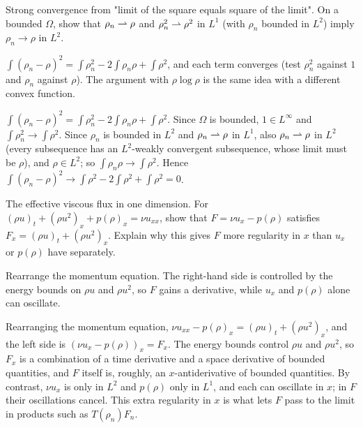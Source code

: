 \begin{exercise}
  Strong convergence from "limit of the square equals square of the limit". On a bounded $\Omega$, show that $\rho_n \rightharpoonup \rho$ and $\rho_n^2 \rightharpoonup \rho^2$ in $L^1$ (with $\rho_n$ bounded in $L^2$) imply $\rho_n \to \rho$ in $L^2$.
  \begin{hint}
    $\int(\rho_n - \rho)^2 = \int\rho_n^2 - 2\int\rho_n\rho + \int\rho^2$, and each term converges (test $\rho_n^2$ against $1$ and $\rho_n$ against $\rho$). The argument with $\rho\log\rho$ is the same idea with a different convex function.
  \end{hint}
  \begin{solution}
    $\int(\rho_n - \rho)^2 = \int\rho_n^2 - 2\int\rho_n\rho + \int\rho^2$. Since $\Omega$ is bounded, $1 \in L^\infty$ and $\int\rho_n^2 \to \int\rho^2$. Since $\rho_n$ is bounded in $L^2$ and $\rho_n \rightharpoonup \rho$ in $L^1$, also $\rho_n \rightharpoonup \rho$ in $L^2$ (every subsequence has an $L^2$-weakly convergent subsequence, whose limit must be $\rho$), and $\rho \in L^2$; so $\int\rho_n\rho \to \int\rho^2$. Hence $\int(\rho_n - \rho)^2 \to \int\rho^2 - 2\int\rho^2 + \int\rho^2 = 0$.
  \end{solution}
\end{exercise}

\begin{exercise}
  The effective viscous flux in one dimension. For $(\rho u)_t + (\rho u^2)_x + p(\rho)_x = \nu u_{xx}$, show that $F = \nu u_x - p(\rho)$ satisfies $F_x = (\rho u)_t + (\rho u^2)_x$. Explain why this gives $F$ more regularity in $x$ than $u_x$ or $p(\rho)$ have separately.
  \begin{hint}
    Rearrange the momentum equation. The right-hand side is controlled by the energy bounds on $\rho u$ and $\rho u^2$, so $F$ gains a derivative, while $u_x$ and $p(\rho)$ alone can oscillate.
  \end{hint}
  \begin{solution}
    Rearranging the momentum equation, $\nu u_{xx} - p(\rho)_x = (\rho u)_t + (\rho u^2)_x$, and the left side is $(\nu u_x - p(\rho))_x = F_x$. The energy bounds control $\rho u$ and $\rho u^2$, so $F_x$ is a combination of a time derivative and a space derivative of bounded quantities, and $F$ itself is, roughly, an $x$-antiderivative of bounded quantities. By contrast, $\nu u_x$ is only in $L^2$ and $p(\rho)$ only in $L^1$, and each can oscillate in $x$; in $F$ their oscillations cancel. This extra regularity in $x$ is what lets $F$ pass to the limit in products such as $T(\rho_n)F_n$.
  \end{solution}
\end{exercise}


